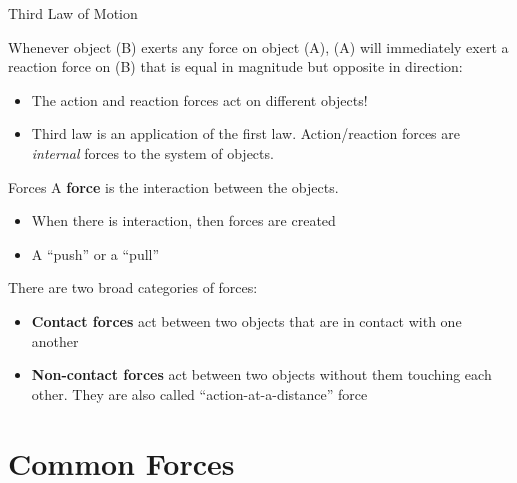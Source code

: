 \documentclass[12pt,compress,aspectratio=169]{beamer}
\begin{document}
\begin{frame}{Third Law of Motion}
  \begin{center}
  \end{center}

  Whenever object (B) exerts any force on object (A), (A) will immediately
  exert a reaction force on (B) that is equal in magnitude but opposite in
  direction:

  \begin{itemize}
  \item The action and reaction forces act on different objects!
  \item Third law is an application of the first law. Action/reaction forces
    are \emph{internal} forces to the system of objects.
  \end{itemize}
\end{frame}



\begin{frame}{Forces}
  A \textbf{force} is the interaction between the objects.
  \begin{itemize}
  \item When there is interaction, then forces are created
  \item A ``push'' or a ``pull''
  \end{itemize}
  There are two broad categories of forces:
  \begin{itemize}
  \item\textbf{Contact forces} act between two objects that are in contact
    with one another
  \item\textbf{Non-contact forces} act between two objects without them
    touching each other. They are also called ``action-at-a-distance'' force
  \end{itemize}
\end{frame}



\section{Common Forces}
\end{document}
